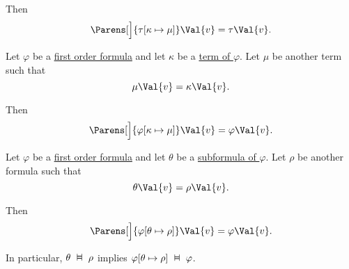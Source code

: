 \begin{proposition}
\begin{PropEnum}
    Then
    \begin{equation}\label{eq:thm:first_order_substitution_equivalence/term_in_term}
      \Parens[\Big]{ \tau[\kappa \mapsto \mu] }\Val{v} = \tau\Val{v}.
    \end{equation}

     Let \( \varphi \) be a \hyperref[def:first_order_language/formula]{first order formula} and let \( \kappa \) be a \hyperref[def:first_order_language/formula_terms]{term of \( \varphi \)}. Let \( \mu \) be another term such that
    \begin{equation}\label{eq:thm:first_order_substitution_equivalence/term_in_formula/compatibility}
      \mu\Val{v} = \kappa\Val{v}.
    \end{equation}

    Then
    \begin{equation}\label{eq:thm:first_order_substitution_equivalence/term_in_formula}
      \Parens[\Big]{ \varphi[\kappa \mapsto \mu] }\Val{v} = \varphi\Val{v}.
    \end{equation}

     Let \( \varphi \) be a \hyperref[def:first_order_language/formula]{first order formula} and let \( \theta \) be a \hyperref[def:first_order_language/subformula]{subformula of \( \varphi \)}. Let \( \rho \) be another formula such that
    \begin{equation}\label{eq:thm:first_order_substitution_equivalence/formula_in_formula/compatibility}
      \theta\Val{v} = \rho\Val{v}.
    \end{equation}

    Then
    \begin{equation}\label{eq:thm:first_order_substitution_equivalence/formula_in_formula}
      \Parens[\Big]{ \varphi[\theta \mapsto \rho] }\Val{v} = \varphi\Val{v}.
    \end{equation}

    In particular, \( \theta \Sequiv \rho \) implies \( \varphi[\theta \mapsto \rho] \Sequiv \varphi \).
  \end{PropEnum}
\end{proposition}
